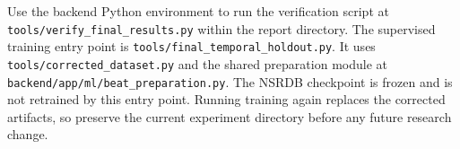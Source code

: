 Use the backend Python environment to run the verification script at
\nolinkurl{tools/verify_final_results.py} within the report directory.
The supervised training entry point is
\nolinkurl{tools/final_temporal_holdout.py}.
It uses \nolinkurl{tools/corrected_dataset.py} and the shared preparation
module at \nolinkurl{backend/app/ml/beat_preparation.py}.
The NSRDB checkpoint is frozen and is not retrained by this entry point.
Running training again replaces the corrected artifacts, so preserve the
current experiment directory before any future research change.
\endgroup
